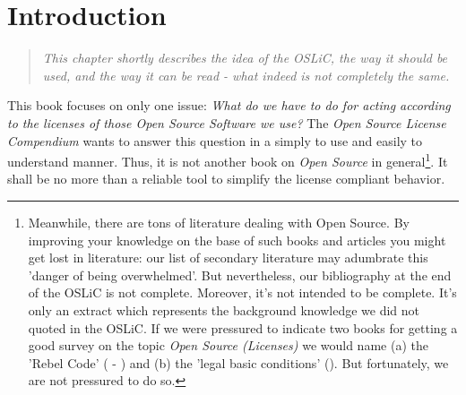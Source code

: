 %
%
%
%
%




\chapter{Introduction}

\footnotesize \begin{quote}\itshape This chapter shortly describes the idea of
the OSLiC, the way it should be used, and the way it can be read - what indeed
is not completely the same.
\end{quote}
\normalsize{}

This book focuses on only one issue: \emph{What do we have to do for acting
according to the licenses of those \emph{Open Source Software} we use?} The
\emph{Open Source License Compendium} wants to answer this question in a simply
to use and easily to understand manner. Thus, it is not another book on \emph{Open
Source} in ge\-ne\-ral\footnote{Meanwhile, there are tons of literature
dealing with Open Source. By improving your knowledge on the base of such books
and articles you might get lost in literature: our list of secondary literature
may adumbrate this 'danger of being overwhelmed'. But nevertheless, our
bibliography at the end of the OSLiC is not complete. Moreover, it's not
intended to be complete. It's only an extract which represents the background
knowledge we did not quoted in the OSLiC. If we were pressured to indicate two
books for getting a good survey on the topic \emph{Open Source (Licenses)} we
would name (a) the 'Rebel Code' (\cite[for a German version cf.][\nopage
passim]{Moody2001a} - \cite[for an English version cf.][passim]{Moody2002a}) and
(b) the 'legal basic conditions' (\cite[cf.][\nopage passim]{JaeMet2011a}). But
fortunately, we are not pressured to do so.}. It shall be no more than a
reliable tool to simplify the license compliant behavior.

